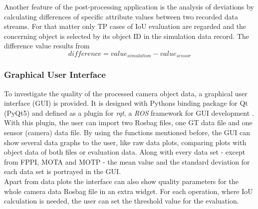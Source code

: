 Another feature of the post-processing application is the analysis of deviations by calculating differences of specific attribute values between two recorded data streams. For that matter only \ac{TP} cases of IoU evaluation are regarded and the concerning object is selected by its object \ac{ID} in the simulation data record. The difference value results from
\begin{equation}
	difference = value_{simulation} - value_{sensor} 
	\label{eq:diff}
\end{equation}

\subsubsection{Graphical User Interface}
To investigate the quality of the processed camera object data, a graphical user interface (GUI) is provided. It is designed with Pythons binding package for Qt (PyQt5) \cite{PyQt5} and defined as a plugin for \textit{rqt}, a \textit{\ac{ROS}} framework for GUI development \cite{rqt}.
With this plugin, the user can import two Rosbag files, one GT data file and one sensor (camera) data file.
By using the functions mentioned before, the GUI can show several data graphs to the user, like raw data plots, comparing plots with object data of both files or evaluation data. 
Along with every data set - except from FPPI, MOTA and MOTP - the mean value and the standard deviation for each data set is portrayed in the GUI. \\
Apart from data plots the interface can also show quality parameters for the whole camera data Rosbag file in an extra widget. For each operation, where IoU calculation is needed, the user can set the threshold value for the evaluation. 